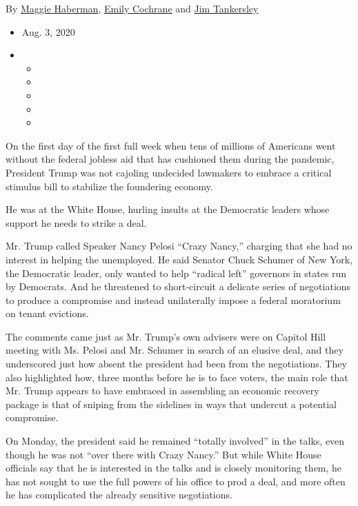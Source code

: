 By \href{https://www.nytimes.com/by/maggie-haberman}{Maggie Haberman},
\href{https://www.nytimes.com/by/emily-cochrane}{Emily Cochrane} and
\href{https://www.nytimes.com/by/jim-tankersley}{Jim Tankersley}

\begin{itemize}
\item
  Aug. 3, 2020
\item
  \begin{itemize}
  \item
  \item
  \item
  \item
  \item
  \end{itemize}
\end{itemize}

On the first day of the first full week when tens of millions of
Americans went without the federal jobless aid that has cushioned them
during the pandemic, President Trump was not cajoling undecided
lawmakers to embrace a critical stimulus bill to stabilize the
foundering economy.

He was at the White House, hurling insults at the Democratic leaders
whose support he needs to strike a deal.

Mr. Trump called Speaker Nancy Pelosi ``Crazy Nancy,'' charging that she
had no interest in helping the unemployed. He said Senator Chuck Schumer
of New York, the Democratic leader, only wanted to help ``radical left''
governors in states run by Democrats. And he threatened to short-circuit
a delicate series of negotiations to produce a compromise and instead
unilaterally impose a federal moratorium on tenant evictions.

The comments came just as Mr. Trump's own advisers were on Capitol Hill
meeting with Ms. Pelosi and Mr. Schumer in search of an elusive deal,
and they underscored just how absent the president had been from the
negotiations. They also highlighted how, three months before he is to
face voters, the main role that Mr. Trump appears to have embraced in
assembling an economic recovery package is that of sniping from the
sidelines in ways that undercut a potential compromise.

On Monday, the president said he remained ``totally involved'' in the
talks, even though he was not ``over there with Crazy Nancy.'' But while
White House officials say that he is interested in the talks and is
closely monitoring them, he has not sought to use the full powers of his
office to prod a deal, and more often he has complicated the already
sensitive negotiations.

